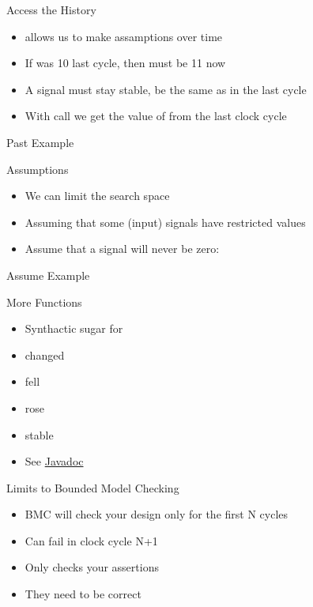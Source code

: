 \begin{frame}[fragile]{Access the History}
\begin{itemize}
\item {} allows us to make assamptions over time
\item If  was 10 last cycle, then  must be 11 now
\item A signal must stay stable, be the same as in the last cycle
\item With  call we get the value of  from the last clock cycle
\end{itemize}
\end{frame}

\begin{frame}[fragile]{Past Example}
\end{frame}

\begin{frame}[fragile]{Assumptions}
\begin{itemize}
\item We can limit the search space
\item Assuming that some (input) signals have restricted values
\item Assume that a signal will never be zero:
\end{itemize}
\end{frame}

\begin{frame}[fragile]{Assume Example}
\end{frame}

\begin{frame}[fragile]{More Functions}
\begin{itemize}
\item Synthactic sugar for 
\item changed
\item fell
\item rose
\item stable
\item See \href{https://www.javadoc.io/static/edu.berkeley.cs/chiseltest_2.12/0.5.5/chiseltest/formal/index.html}{Javadoc}
\end{itemize}
\end{frame}

\begin{frame}[fragile]{Limits to Bounded Model Checking}
\begin{itemize}
\item BMC will check your design only for the first N cycles
\item Can fail in clock cycle N+1
\item Only checks your assertions
\item They need to be correct
\end{itemize}
\end{frame}

